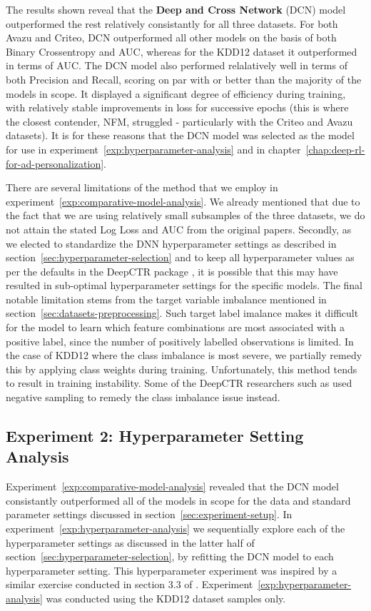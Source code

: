 \documentclass{mldsmsc}
\begin{document}
The results shown reveal that the \textbf{Deep and Cross Network} (DCN)
model outperformed the rest relatively consistantly for all three datasets. For both
Avazu and Criteo, DCN outperformed all other models on the basis of both Binary Crossentropy
and AUC, whereas for the KDD12 dataset it outperformed in terms of AUC. The DCN
model also performed relalatively well in terms of both Precision and Recall,
scoring on par with or better than the majority of the models in scope. It displayed
a significant degree of efficiency during training, with relatively stable improvements in
loss for successive epochs (this is where the closest contender, NFM, struggled - particularly with the
Criteo and Avazu datasets). It is for these reasons that the DCN model was selected as the model
for use in experiment~\ref{exp:hyperparameter-analysis} and in chapter~\ref{chap:deep-rl-for-ad-personalization}.

There are several limitations of the method that we employ in experiment~\ref{exp:comparative-model-analysis}.
We already mentioned that due to the fact that we are using relatively small subsamples of the three
datasets, we do not attain the stated Log Loss and AUC from the original papers. Secondly, as we
elected to standardize the DNN hyperparameter settings as described in section~\ref{sec:hyperparameter-selection} and to keep all hyperparameter values as per
the defaults in the DeepCTR package \citep{RefWorks:shen2017deepctr:}, it is possible that this
may have resulted in sub-optimal hyperparameter settings for the specific models. The final notable limitation
stems from the target variable imbalance mentioned in section~\ref{sec:datasets-preprocessing}. Such
target label imalance makes it difficult for the model to learn which feature combinations are most associated
with a positive label, since the number of positively labelled observations is limited. In the case of
KDD12 where the class imbalance is most severe, we partially remedy this by applying class weights during
training. Unfortunately, this method tends to result in training instability. Some of the DeepCTR
researchers such as \cite{RefWorks:liu2019feature} used negative sampling to remedy the class imbalance issue instead.

\subsection{Experiment 2: Hyperparameter Setting Analysis}

Experiment~\ref{exp:comparative-model-analysis} revealed that the DCN model consistantly outperformed
all of the models in scope for the data and standard parameter settings discussed in
section~\ref{sec:experiment-setup}. In experiment~\ref{exp:hyperparameter-analysis} we
sequentially explore each of the hyperparameter settings as discussed in the latter half
of section~\ref{sec:hyperparameter-selection}, by refitting the DCN model to each hyperparameter
setting. This hyperparameter experiment was inspired by a similar exercise conducted in section
3.3 of \citep{RefWorks:guo2017deepfm:}. Experiment~\ref{exp:hyperparameter-analysis} was
conducted using the KDD12 dataset samples only.
\end{document}
